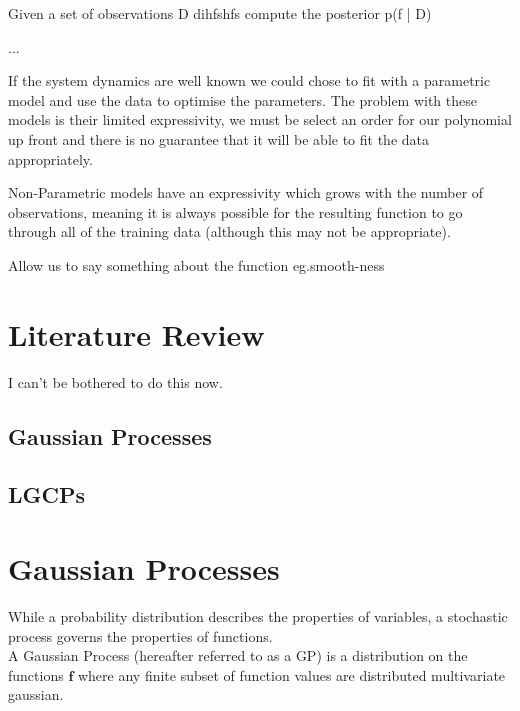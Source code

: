 \documentclass[a4paper,11pt]{report}
\begin{document}
Given a set of observations D dihfshfs compute the posterior p(f | D) 


...

If the system dynamics are well known we could chose to fit with a parametric model and use the data to optimise the parameters. The problem with these models is their limited expressivity, we must be select an order for our polynomial up front and there is no guarantee that it will be able to fit the data appropriately.

Non-Parametric models have an expressivity which grows with the number of observations, meaning it is always possible for the resulting function to go through all of the training data (although this may not be appropriate). 


Allow us to say something about the function eg.smooth-ness

\chapter{Literature Review}
I can't be bothered to do this now.

\section{Gaussian Processes}

\section{LGCPs}

\section{}

\chapter{Gaussian Processes}

While a probability distribution describes the properties of variables, a stochastic process governs the properties of functions. \\

A Gaussian Process (hereafter referred to as a GP) is a distribution on the functions \(\mathbf{f}\) where any finite subset of function values are distributed multivariate gaussian. 
\end{document}
